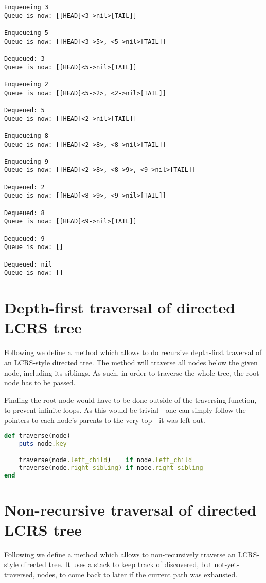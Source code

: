 \documentclass[a4paper]{scrartcl}
\begin{document}
\begin{lstlisting}
Enqueueing 3
Queue is now: [[HEAD]<3->nil>[TAIL]]

Enqueueing 5
Queue is now: [[HEAD]<3->5>, <5->nil>[TAIL]]

Dequeued: 3
Queue is now: [[HEAD]<5->nil>[TAIL]]

Enqueueing 2
Queue is now: [[HEAD]<5->2>, <2->nil>[TAIL]]

Dequeued: 5
Queue is now: [[HEAD]<2->nil>[TAIL]]

Enqueueing 8
Queue is now: [[HEAD]<2->8>, <8->nil>[TAIL]]

Enqueueing 9
Queue is now: [[HEAD]<2->8>, <8->9>, <9->nil>[TAIL]]

Dequeued: 2
Queue is now: [[HEAD]<8->9>, <9->nil>[TAIL]]

Dequeued: 8
Queue is now: [[HEAD]<9->nil>[TAIL]]

Dequeued: 9
Queue is now: []

Dequeued: nil
Queue is now: []
\end{lstlisting}

\section{Depth-first traversal of directed LCRS tree}

Following we define a method which allows to do recursive depth-first traversal
of an LCRS-style directed tree. The method will traverse all nodes below the
given node, including its siblings.  As such, in order to traverse the whole
tree, the root node has to be passed.

Finding the root node would have to be done outside of the traversing function,
to prevent infinite loops. As this would be trivial - one can simply follow the
pointers to each node's parents to the very top - it was left out.

\begin{lstlisting}[language=ruby]
def traverse(node)
    puts node.key

    traverse(node.left_child)    if node.left_child
    traverse(node.right_sibling) if node.right_sibling
end
\end{lstlisting}

\section{Non-recursive traversal of directed LCRS tree}

Following we define a method which allows to non-recursively traverse an
LCRS-style directed tree. It uses a stack to keep track of discovered, but
not-yet-traversed, nodes, to come back to later if the current path was
exhausted.
\end{document}

